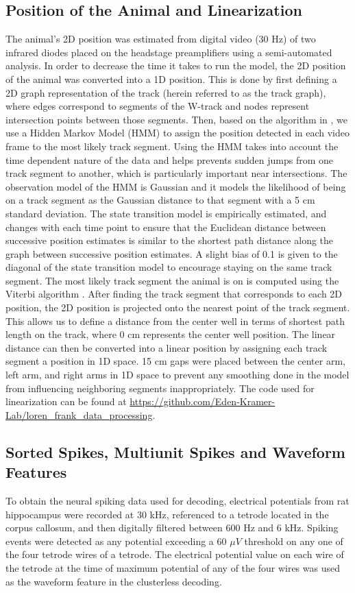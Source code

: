 \documentclass[9pt,lineno]{elife}
\begin{document}
\subsection*{Position of the Animal and Linearization}
The animal's 2D position was estimated from digital video (30 Hz) of two infrared diodes placed on the headstage preamplifiers using a semi-automated analysis. In order to decrease the time it takes to run the model, the 2D position of the animal was converted into a 1D position. This is done by first defining a 2D graph representation of the track (herein referred to as the track graph), where edges correspond to segments of the W-track and nodes represent intersection points between those segments. Then, based on the algorithm in \cite{NewsonHiddenMarkovmap2009}, we use a Hidden Markov Model (HMM) to assign the position detected in each video frame to the most likely track segment. Using the HMM takes into account the time dependent nature of the data and helps prevents sudden jumps from one track segment to another, which is particularly important near intersections. The observation model of the HMM is Gaussian and it models the likelihood of being on a track segment as the Gaussian distance to that segment with a 5 cm standard deviation. The state transition model is empirically estimated, and changes with each time point to ensure that the Euclidean distance between successive position estimates is similar to the shortest path distance along the graph between successive position estimates. A slight bias of 0.1 is given to the diagonal of the state transition model to encourage staying on the same track segment. The most likely track segment the animal is on is computed using the Viterbi algorithm \citep{ViterbiErrorboundsconvolutional1967}. After finding the track segment that corresponds to each 2D position, the 2D position is projected onto the nearest point of the track segment. This allows us to define a distance from the center well in terms of shortest path length on the track, where 0 cm represents the center well position. The linear distance can then be converted into a linear position by assigning each track segment a position in 1D space. 15 cm gaps were placed between the center arm, left arm, and right arms in 1D space to prevent any smoothing done in the model from influencing neighboring segments inappropriately. The code used for linearization can be found at \url{https://github.com/Eden-Kramer-Lab/loren_frank_data_processing}.

\subsection*{Sorted Spikes, Multiunit Spikes and Waveform Features}
To obtain the neural spiking data used for decoding, electrical potentials from rat hippocampus were recorded at 30 kHz, referenced to a tetrode located in the corpus callosum, and then digitally filtered between 600 Hz and 6 kHz. Spiking events were detected as any potential exceeding a 60 $\mu V$ threshold on any one of the four tetrode wires of a tetrode. The electrical potential value on each wire of the tetrode at the time of maximum potential of any of the four wires was used as the waveform feature in the clusterless decoding.
\end{document}
